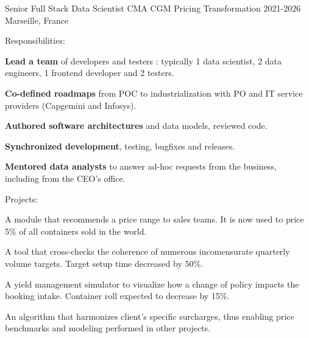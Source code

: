 
\begin{cventries}
  \cventry
  {Senior Full Stack Data Scientist} %
  {CMA CGM Pricing Transformation} %
  {2021-2026} %
  {Marseille, France} %
  {
    \begin{cvitemsplain} %
    \item{Responsibilities:}
    \vspace{.2cm}
    \end{cvitemsplain}
    \begin{cvitemsspaced}
    \item{\textbf{Lead a team} of developers and testers : typically 1 data scientist, 2 data engineers, 1 frontend developer and 2 testers.}
    \item{\textbf{Co-defined roadmaps} from POC to industrialization with PO and IT service providers (Capgemini and Infosys).}
    \item{\textbf{Authored software architectures} and data models, reviewed code.}
    \item{\textbf{Synchronized development}, testing, bugfixes and releases.}
    \item{\textbf{Mentored data analysts} to answer ad-hoc requests from the business, including from the CEO's office.}
    \end{cvitemsspaced}
    \begin{cvitemsplain}
    \vspace{.5cm}
    \item{Projects:}
    \vspace{.2cm}
    \end{cvitemsplain}
    \begin{cvitemsspaced}
    \item{A module that recommends a price range to sales teams. It is now used to price 5\% of all containers sold in the world.}
    \item{A tool that cross-checks the coherence of numerous incomensurate quarterly volume targets. Target setup time decreased by 50\%.}
    \item{A yield management simulator to visualize how a change of policy impacts the booking intake. Container roll expected to decrease by 15\%.}
    \item{An algorithm that harmonizes client's specific surcharges, thus enabling price benchmarks and modeling performed in other projects.}
    \end{cvitemsspaced}
  }


\end{cventries}
